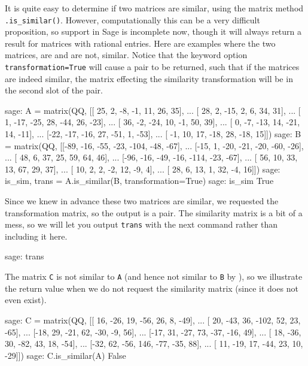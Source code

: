 It is quite easy to determine if two matrices are similar, using the matrix method \verb!.is_similar()!.  However, computationally this can be a very difficult proposition, so support in Sage is incomplete now, though it will always return a result for matrices with rational entries.  Here are examples where the two matrices, are and are not, similar.  Notice that the keyword option \verb!transformation=True! will cause a pair to be returned, such that if the matrices are indeed similar, the matrix effecting the similarity transformation will be in the second slot of the pair.
%
\begin{sageexample}
sage: A = matrix(QQ, [[ 25,   2,  -8,  -1,  11,  26,  35],
...                   [ 28,   2, -15,   2,   6,  34,  31],
...                   [  1, -17, -25,  28, -44,  26, -23],
...                   [ 36,  -2, -24,  10,  -1,  50,  39],
...                   [  0,  -7, -13,  14, -21,  14, -11],
...                   [-22, -17, -16,  27, -51,   1, -53],
...                   [  -1, 10,  17, -18,  28, -18,  15]])
sage: B = matrix(QQ, [[-89, -16, -55, -23, -104, -48, -67],
...                   [-15,   1, -20, -21,  -20, -60, -26],
...                   [ 48,   6,  37,  25,   59,  64,  46],
...                   [-96, -16, -49, -16, -114, -23, -67],
...                   [ 56,  10,  33,  13,   67,  29,  37],
...                   [ 10,   2,   2,  -2,   12,  -9,   4],
...                   [ 28,   6,  13,   1,   32,  -4,  16]])
sage: is_sim, trans = A.is_similar(B, transformation=True)
sage: is_sim
True
\end{sageexample}
%
Since we knew in advance these two matrices are similar, we requested the transformation matrix, so the output is a pair.  The similarity matrix is a bit of a mess, so we will let you output \verb?trans? with the next command rather than including it here.
%
\begin{sageverbatim}
sage: trans
\end{sageverbatim}
%
The matrix \verb!C! is not similar to \verb!A! (and hence not similar to \verb!B! by ), so we illustrate the return value when we do not request the similarity matrix (since it does not even exist).
%
\begin{sageexample}
sage: C = matrix(QQ, [[ 16, -26,  19,  -56,  26,   8, -49],
...                   [ 20, -43,  36, -102,  52,  23, -65],
...                   [-18,  29, -21,   62, -30,  -9,  56],
...                   [-17,  31, -27,   73, -37, -16,  49],
...                   [ 18, -36,  30,  -82,  43,  18, -54],
...                   [-32,  62, -56,  146, -77, -35,  88],
...                   [ 11, -19,  17,  -44,  23,  10, -29]])
sage: C.is_similar(A)
False
\end{sageexample}
%
\begin{sageverbatim}
\end{sageverbatim}
%

